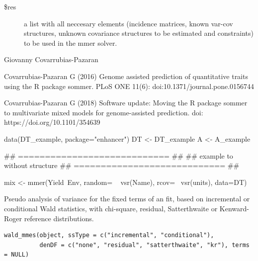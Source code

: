 \documentclass[a4paper]{book}
\begin{document}
%
\begin{Value}
\begin{description}

\item[\$res] a list with all neccesary elements (incidence matrices, known var-cov structures, unknown covariance structures to be estimated and constraints) to be used in the mmer solver.

\end{description}

\end{Value}
%
\begin{Author}\relax
Giovanny Covarrubias-Pazaran
\end{Author}
%
\begin{References}\relax
Covarrubias-Pazaran G (2016) Genome assisted prediction of quantitative traits using the R package sommer. PLoS ONE 11(6): doi:10.1371/journal.pone.0156744 

Covarrubias-Pazaran G (2018) Software update: Moving the R package sommer to
multivariate mixed models for genome-assisted prediction. doi:
https://doi.org/10.1101/354639
\end{References}
%
\begin{Examples}
\begin{ExampleCode}

data(DT_example, package="enhancer")
DT <- DT_example
A <- A_example

## ============================ ##
## example to without structure
## ============================ ##

mix <- mmer(Yield~Env, 
            random= ~ vsr(Name),
            rcov=~ vsr(units),
            data=DT)

\end{ExampleCode}
\end{Examples}
%
\begin{Description}\relax
Pseudo analysis of variance for the fixed terms of an  fit,
based on incremental or conditional Wald statistics, with chi-square,
residual, Satterthwaite or Kenward-Roger reference distributions.
\end{Description}
%
\begin{Usage}
\begin{verbatim}
wald_mmes(object, ssType = c("incremental", "conditional"),
          denDF = c("none", "residual", "satterthwaite", "kr"), terms = NULL)
\end{verbatim}
\end{Usage}
\end{document}
